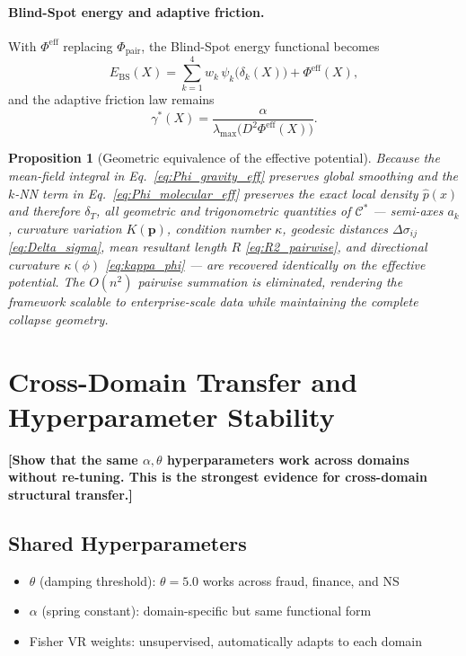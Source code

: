 \documentclass[11pt,a4paper]{article}
\newcommand{\Ebs}{E_{\mathrm{BS}}}
\newcommand{\Cman}{\mathcal{C}^*}
\newcommand{\lmax}{\lambda_{\max}}
\newtheorem{proposition}[theorem]{Proposition}
\begin{document}
\paragraph{Blind-Spot energy and adaptive friction.}
With $\Phi^{\mathrm{eff}}$ replacing $\Phi_{\mathrm{pair}}$, the
Blind-Spot energy functional becomes
\begin{equation}\label{eq:Ebs_eff}
  \Ebs(X)
  = \sum_{k=1}^{4} w_k\,\psi_k\bigl(\delta_k(X)\bigr)
    + \Phi^{\mathrm{eff}}(X),
\end{equation}
and the adaptive friction law remains
\begin{equation}\label{eq:friction_eff}
  \gamma^*(X) = \frac{\alpha}{\lmax\bigl(D^2\Phi^{\mathrm{eff}}(X)\bigr)}.
\end{equation}

\begin{proposition}[Geometric equivalence of the effective potential]
\label{prop:pairwise_equiv}
Because the mean-field integral in
Eq.~\eqref{eq:Phi_gravity_eff} preserves global smoothing and
the $k$-NN term in Eq.~\eqref{eq:Phi_molecular_eff} preserves
the exact local density $\hat{p}(x)$ and therefore $\delta_T$,
all geometric and trigonometric quantities of $\Cman$ --- semi-axes
$a_k$, curvature variation $K(\mathbf{p})$, condition number $\kappa$,
geodesic distances $\Delta\sigma_{ij}$ \eqref{eq:Delta_sigma}, mean
resultant length $R$ \eqref{eq:R2_pairwise}, and directional curvature
$\kappa(\phi)$ \eqref{eq:kappa_phi} --- are recovered identically on
the effective potential.  The $O(n^2)$ pairwise summation is eliminated,
rendering the framework scalable to enterprise-scale data while
maintaining the complete collapse geometry.
\end{proposition}


\section{Cross-Domain Transfer and Hyperparameter Stability}\label{sec:transfer}

\textbf{[Show that the same $\alpha, \theta$ hyperparameters work
across domains without re-tuning.  This is the strongest evidence
for cross-domain structural transfer.]}

\subsection{Shared Hyperparameters}
\begin{itemize}[nosep]
  \item $\theta$ (damping threshold): $\theta = 5.0$ works across fraud,
        finance, and NS
  \item $\alpha$ (spring constant): domain-specific but same functional form
  \item Fisher VR weights: unsupervised, automatically adapts to each domain
\end{itemize}
\end{document}
